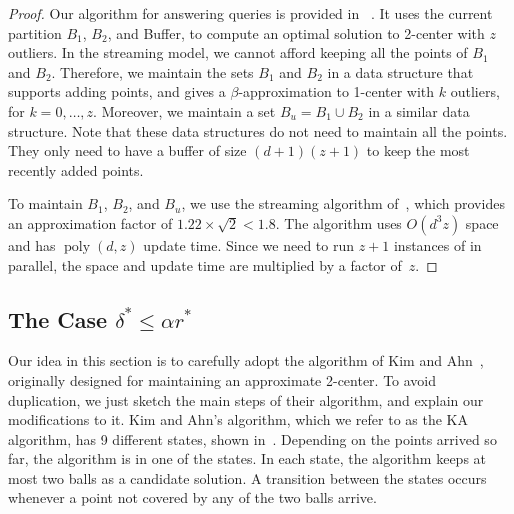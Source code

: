 \documentclass[envcountsame]{cls/cccg15}
\newcommand{\dz}{(d + 1)(z + 1)}
\newcommand{\poly}{\mathop{\mathrm{poly}}}
\newcommand{\lee}{\leqslant}
\renewcommand{\leq}{\lee}
\begin{document}
\begin{proof}
Our algorithm for answering queries is provided in ~.
It uses the current partition $B_1$, $B_2$, and Buffer, to compute
an optimal solution to 2-center with $z$ outliers.
In the streaming model, we cannot afford keeping all the points of $B_1$ and $B_2$. 
Therefore, we maintain the sets $B_1$ and $B_2$ 
in a data structure that supports adding points,
and gives a $\beta$-approximation to 1-center with $k$ outliers, for $k=0,\dots,z$.
Moreover, we maintain a set $B_u = B_1 \cup B_2$ in a similar data structure.
Note that these data structures do not need to maintain all the points. 
They only need to have a buffer of size $\dz$ to keep the most recently added points.

To maintain $B_1$, $B_2$, and $B_u$, we 
use the streaming algorithm of~\cite{zarrabi2009streaming,chan2014streaming},
which provides an approximation factor of $1.22 \times \sqrt{2} <1.8$.
The algorithm uses $O(d^3z)$ space and has $\poly(d,z)$ update time.
Since we need to run $z + 1$ instances of  in parallel, 
the space and update time are multiplied by a factor of~$z$.
\end{proof}



\subsection{The Case $\delta^* \leq \alpha r^*$}
\label{subsec:smaller}

Our idea in this section is to carefully adopt
the algorithm of Kim and Ahn~\cite{kim2014improved},
originally designed for maintaining an approximate 2-center.
To avoid duplication, we just sketch the main steps of their algorithm,
and explain our modifications to it. 
Kim and Ahn's algorithm, which we refer to as the KA algorithm,
has 9 different states, shown in~.
Depending on the points arrived so far, the algorithm is in one of the states.
In each state, the algorithm keeps at most two balls as a candidate solution. 
A transition between the states occurs whenever a point not covered by any of the two balls arrive. 
\end{document}

